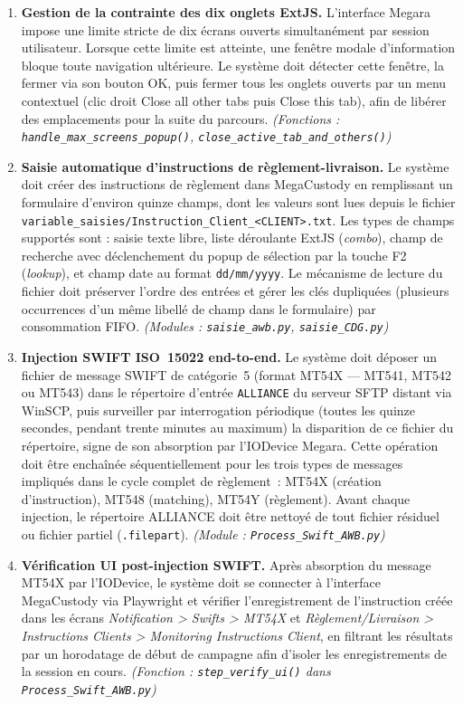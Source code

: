 \documentclass[12pt, a4paper]{report}
\begin{document}
\begin{enumerate}[label=\textbf{BF\arabic*.}, leftmargin=*, itemsep=6pt]
  \item \textbf{Gestion de la contrainte des dix onglets ExtJS.}
  L'interface Megara impose une limite stricte de dix écrans ouverts simultanément par session utilisateur. Lorsque cette limite est atteinte, une fenêtre modale d'information bloque toute navigation ultérieure. Le système doit détecter cette fenêtre, la fermer via son bouton OK, puis fermer tous les onglets ouverts par un menu contextuel (clic droit \og{}Close all other tabs\fg{} puis \og{}Close this tab\fg{}), afin de libérer des emplacements pour la suite du parcours.
  \textit{(Fonctions : \texttt{handle\_max\_screens\_popup()}, \texttt{close\_active\_tab\_and\_others()})}

  \item \textbf{Saisie automatique d'instructions de règlement-livraison.}
  Le système doit créer des instructions de règlement dans MegaCustody en remplissant un formulaire d'environ quinze champs, dont les valeurs sont lues depuis le fichier \nolinkurl{variable_saisies/Instruction_Client_<CLIENT>.txt}. Les types de champs supportés sont : saisie texte libre, liste déroulante ExtJS (\textit{combo}), champ de recherche avec déclenchement du popup de sélection par la touche F2 (\textit{lookup}), et champ date au format \texttt{dd/mm/yyyy}. Le mécanisme de lecture du fichier doit préserver l'ordre des entrées et gérer les clés dupliquées (plusieurs occurrences d'un même libellé de champ dans le formulaire) par consommation FIFO.
  \textit{(Modules : \texttt{saisie\_awb.py}, \texttt{saisie\_CDG.py})}

  \item \textbf{Injection SWIFT ISO~15022 end-to-end.}
  Le système doit déposer un fichier de message SWIFT de catégorie~5 (format MT54X — MT541, MT542 ou MT543) dans le répertoire d'entrée \texttt{ALLIANCE} du serveur SFTP distant via WinSCP, puis surveiller par interrogation périodique (toutes les quinze secondes, pendant trente minutes au maximum) la disparition de ce fichier du répertoire, signe de son absorption par l'IODevice Megara. Cette opération doit être enchaînée séquentiellement pour les trois types de messages impliqués dans le cycle complet de règlement~: MT54X (création d'instruction), MT548 (matching), MT54Y (règlement). Avant chaque injection, le répertoire ALLIANCE doit être nettoyé de tout fichier résiduel ou fichier partiel (\texttt{.filepart}).
  \textit{(Module : \texttt{Process\_Swift\_AWB.py})}

  \item \textbf{Vérification UI post-injection SWIFT.}
  Après absorption du message MT54X par l'IODevice, le système doit se connecter à l'interface MegaCustody via Playwright et vérifier l'enregistrement de l'instruction créée dans les écrans \textit{Notification > Swifts > MT54X} et \textit{Règlement/Livraison > Instructions Clients > Monitoring Instructions Client}, en filtrant les résultats par un horodatage de début de campagne afin d'isoler les enregistrements de la session en cours.
  \textit{(Fonction : \texttt{step\_verify\_ui()} dans \texttt{Process\_Swift\_AWB.py})}


\end{enumerate}
\end{document}
